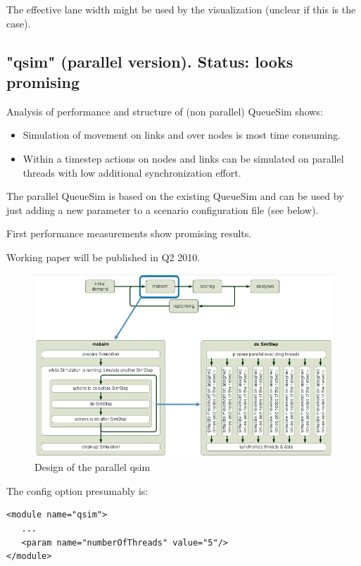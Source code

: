 The effective lane width might be used by the visualization (unclear if this is the case).

\umbruch
\subsection{"qsim" (parallel version). Status: looks promising}



Analysis of performance and structure of (non parallel) QueueSim shows:
\begin{itemize}
	\item Simulation of movement on links and over nodes is most time consuming.
	\item Within a timestep actions on nodes and links can be simulated on parallel threads with low additional synchronization effort.
\end{itemize}

The  parallel QueueSim is based on the existing QueueSim and can be used by  just adding a new parameter to a scenario configuration file (see  below).

First performance measurements show promising results.

Working paper will be published in Q2 2010.

\begin{figure}[htp]
\includegraphics[width=\textwidth]{figures/qsimParallel/parallelqsim.png}
\caption{Design of the parallel qsim}
\end{figure}

The config option presumably is:
\begin{lstlisting}
<module name="qsim">
   ...
   <param name="numberOfThreads" value="5"/>
</module>

\end{lstlisting}

